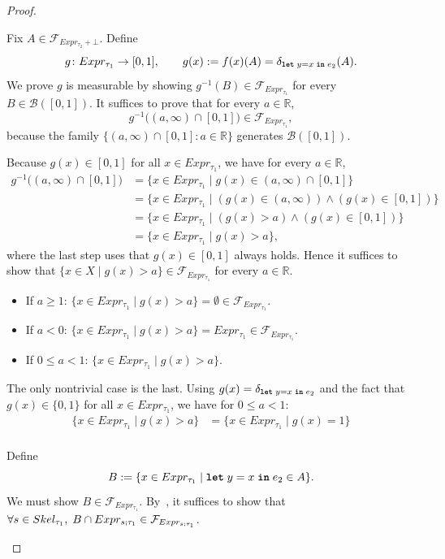 \begin{proof}
\begin{itemize}
		\medskip

		Fix $A \in \mathcal{F}_{Expr_{\tau_2} + \bot}$. Define
		\[
			g \colon Expr_{\tau_1} \to [0,1],
			\qquad
			g(x) := f(x)(A) = \delta_{\textnormal{\ttfamily\bfseries let}\; y = x\; \textnormal{\ttfamily\bfseries in}\; e_2}(A).
		\]
		We prove $g$ is measurable by showing $g^{-1}(B)\in\mathcal{F}_{Expr_{\tau_1}}$ for every
		$B\in\mathcal{B}([0,1])$. It suffices to prove that for every $a\in\mathbb{R}$,
		\[
			g^{-1}\big((a,\infty)\cap[0,1]\big)\in\mathcal{F}_{Expr_{\tau_1}},
		\]
		because the family $\{(a,\infty)\cap[0,1] : a\in\mathbb{R}\}$ generates
		$\mathcal{B}([0,1])$.

		Because $g(x)\in[0,1]$ for all $x\in Expr_{\tau_1}$, we have for every $a\in\mathbb{R}$,
		\begin{align*}
			g^{-1}\big((a,\infty)\cap[0,1]\big)
			&= \{x\in Expr_{\tau_1} \mid g(x)\in (a,\infty)\cap[0,1]\} \\
			&= \{x\in Expr_{\tau_1} \mid (g(x)\in (a,\infty)) \wedge (g(x)\in [0,1])\} \\
			&= \{x\in Expr_{\tau_1} \mid (g(x)>a) \wedge (g(x)\in [0,1])\} \\
			&= \{x\in Expr_{\tau_1} \mid g(x)>a\},
		\end{align*}
		where the last step uses that $g(x)\in[0,1]$ always holds.
		Hence it suffices to show that $\{x\in X \mid g(x)>a\}\in\mathcal{F}_{Expr_{\tau_1}}$
		for every $a\in\mathbb{R}$.

		\begin{itemize}
			\item If $a \geq 1$: $\{x\in Expr_{\tau_1} \mid g(x)>a\} = \emptyset \in \mathcal{F}_{Expr_{\tau_1}}$.
			\item If $a < 0$: $\{x\in Expr_{\tau_1} \mid g(x)>a\} = Expr_{\tau_1} \in \mathcal{F}_{Expr_{\tau_1}}$.
			\item If $0 \leq a < 1$: $\{x \in Expr_{\tau_1} \mid g(x) > a \}$.
		\end{itemize}

		The only nontrivial case is the last. Using $g(x)=\delta_{\textnormal{\ttfamily\bfseries let}\; y = x\; \textnormal{\ttfamily\bfseries in}\; e_2}$ and the fact that
		$g(x) \in\{0,1\}$ for all $x\in Expr_{\tau_1}$, we have for $0\le a<1$:
		\begin{align*}
			\{x \in Expr_{\tau_1} \mid g(x) > a \}
			&= \{x \in Expr_{\tau_1} \mid g(x) = 1 \} \\
		\end{align*}

		Define
		\[
			B := \{x \in Expr_{\tau_1} \mid \textnormal{\ttfamily\bfseries let}\; y = x\; \textnormal{\ttfamily\bfseries in}\; e_2 \in A\}.
		\]
		We must show $B \in \mathcal{F}_{Expr_{\tau_1}}$. By~, it suffices to show that $\forall s \in Skel_{\tau_1},\; B \cap Expr_{s;\tau_1} \in \mathcal{F}_{Expr_{s;\tau_1}}$.


\end{itemize}
\end{proof}
